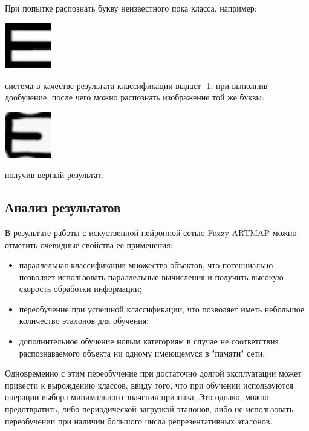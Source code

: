 При попытке распознать букву неизвестного пока класса, например:
\begin{center}
	\includegraphics[width=2cm]{image_for_report/sample_e.jpg}
\end{center}
система в качестве результата классификации выдаст -1, при выполнив дообучение, после чего можно распознать изображение той же буквы:
\begin{center}
	\includegraphics[width=2cm]{image_for_report/sample_e_2.jpg}
\end{center}
получив верный результат.




\subsection{Анализ результатов}

В результате работы с искуственной нейронной сетью Fuzzy ARTMAP можно отметить очевидные свойства ее применения:
\begin{itemize} \compact
 	\item параллельная классификация множества объектов, что потенциально позволяет использовать параллельные вычисления и получить высокую скорость обработки информации;
 	\item переобучение при успешной классификации, что позволяет иметь небольшое количество эталонов для обучения;
 	\item дополнительное обучение новым категориям в случае не соответствия распознаваемого объекта ни одному имеющемуся в "памяти" сети.
\end{itemize} 

Одновременно с этим переобучение при достаточно долгой эксплуатации может привести к вырождению классов, ввиду того, что при обучении используются операции выбора минимального значения признака. Это однако, можно предотвратить, либо периодической загрузкой эталонов, либо не использовать переобучении при наличии большого числа репрезентативных эталонов.


